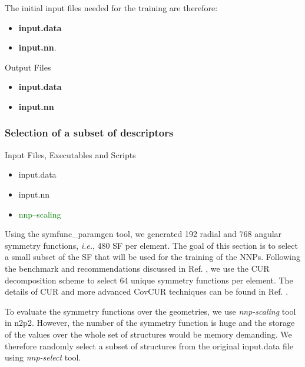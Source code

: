 \documentclass[12pt]{article}
\begin{document}
The initial input files needed for the training are therefore:
\begin{itemize}
    \item \textbf{input.data}
    \item \textbf{input.nn}.
\end{itemize}

\begin{mybox3}{Output Files}
\begin{itemize}
    \item \textbf{input.data}
    \item \textbf{input.nn} 
\end{itemize}
\end{mybox3}

\subsubsection{Selection of a subset of descriptors}
\begin{mybox2}{{Input Files, Executables and Scripts}}
\begin{minipage}[c]{0.5\linewidth}
\end{minipage}
\begin{minipage}[c]{0.5\linewidth}
\begin{itemize}
    \item input.data
    \item input.nn
    \item \textcolor{green}{nnp--scaling}
\end{itemize}
\end{minipage}
\end{mybox2}
Using the symfunc\_paramgen tool, we generated 192 radial and 768 angular symmetry functions, \textit{i.e.}, 480 SF per element. The goal of this section is to select a small subset of the SF that will be used for the training of the NNPs. Following the benchmark and recommendations discussed in Ref. , we use the CUR decomposition scheme to select 64 unique symmetry functions per element. The details of CUR and more advanced CovCUR techniques can be found in Ref. . 

To evaluate the symmetry functions over the geometries, we use \textit{nnp-scaling} tool in n2p2. However, the number of the symmetry function is huge and the storage of the values over the whole set of structures would be memory demanding. We therefore randomly select a subset of structures from the original input.data file using \textit{nnp-select} tool.
\end{document}
